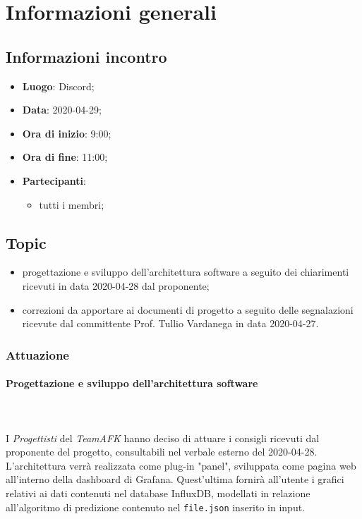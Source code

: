 \section{Informazioni generali}
\subsection{Informazioni incontro}
\begin{itemize}
\item \textbf{Luogo}: Discord;
\item \textbf{Data}: 2020-04-29;
\item \textbf{Ora di inizio}: 9:00;
\item \textbf{Ora di fine}: 11:00;
\item \textbf{Partecipanti}:
	\begin{itemize}
		\item tutti i membri;
	\end{itemize}
\end{itemize}

\subsection{Topic}
\begin{itemize}
\item progettazione e sviluppo dell'architettura software a seguito dei chiarimenti ricevuti in data 2020-04-28 dal proponente;
\item correzioni da apportare ai documenti di progetto a seguito delle segnalazioni ricevute dal committente Prof. Tullio Vardanega in data 2020-04-27.
\end{itemize}

\subsubsection{Attuazione}

\paragraph{Progettazione e sviluppo dell'architettura software} \mbox{} \\ \mbox{} \\
I \textit{Progettisti} del \textit{TeamAFK} hanno deciso di attuare i consigli ricevuti dal proponente del progetto, consultabili nel verbale esterno del 2020-04-28. \\
L'architettura verrà realizzata come plug-in "panel", sviluppata come pagina web all'interno della dashboard di Grafana. Quest'ultima fornirà all'utente i grafici relativi ai dati contenuti nel database InfluxDB, modellati in relazione all'algoritmo di predizione contenuto nel \texttt{file.json} inserito in input.

